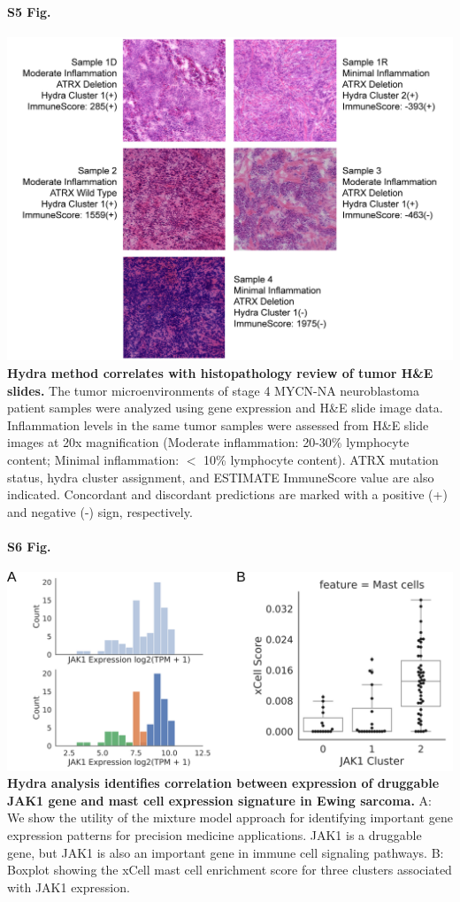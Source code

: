 \documentclass[10pt,letterpaper]{article}
\begin{document}
\paragraph*{S5 Fig.}
\includegraphics[width=\textwidth]{img/PNG/NBL-MYCN-NA-HE-2x}
\label{S5_Fig} {\bf Hydra method correlates with histopathology review of tumor H\&E slides.}
The tumor microenvironments of stage 4 MYCN-NA neuroblastoma patient samples were analyzed using gene expression and H\&E slide image data. Inflammation levels in the same tumor samples were assessed from H\&E slide images at 20x magnification (Moderate inflammation: 20-30\% lymphocyte content; Minimal inflammation: $<$ 10\% lymphocyte content). ATRX mutation status, hydra cluster assignment, and ESTIMATE ImmuneScore value are also indicated. Concordant and discordant predictions are marked with a positive (+) and negative (-) sign, respectively.

\paragraph*{S6 Fig.}
\includegraphics[width=\textwidth]{img/PNG/ewing-jak1-expression-fig}
\label{S6_Fig} {\bf Hydra analysis identifies correlation between expression of druggable JAK1 gene and mast cell expression signature in Ewing sarcoma.} A: We show the utility of the mixture model approach for identifying important gene expression patterns for precision medicine applications. JAK1 is a druggable gene, but JAK1 is also an important gene in immune cell signaling pathways. B: Boxplot showing the xCell mast cell enrichment score for three clusters associated with JAK1 expression.
\end{document}
